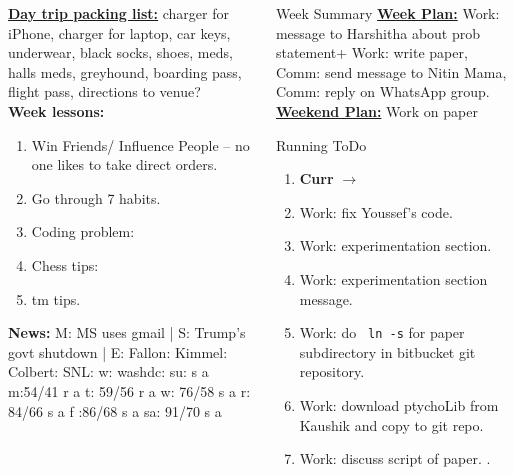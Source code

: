\begin{columns}
\begin{column}{0.25\linewidth}
      \begin{block}
        
      {\underline{\bf Day trip packing list:} charger for iPhone,
        charger for laptop, car keys, underwear, black socks, shoes,
        meds, halls meds, greyhound, boarding pass, flight pass, directions to
        venue?} \\ 
      {\tiny {\bf Week lessons:}} \\ 
      \begin{enumerate}
        \tiny \item \tiny Win Friends/ Influence People – no one
        likes to take direct orders.
      \item \tiny Go through 7 habits.
      \item \tiny Coding problem: 
      \item \tiny Chess tips: 
      \item \tiny tm tips.
      \end{enumerate}
          {{\tiny {\bf News:}} M: MS uses gmail | S:  Trump's govt shutdown | E:
            Fallon:   Kimmel:  Colbert: SNL:
            w: washdc: 
            {su: { s a}}
            {m:{54/41 r a}}
            {t: {59/56 r a}} 
            {w: {76/58 s a}} 
            {r: {84/66 s a}}
            {f :{86/68 s a} }
            {sa: {91/70 s a}}}
    \end{block} 

  \end{column}
  \begin{column}{0.5\linewidth}
    \begin{block}{Week Summary} 
      {\underline {\bf Week Plan:}
        Work: message to Harshitha about prob statement+ Work: write
        paper, Comm: send message to Nitin Mama, Comm: reply on  WhatsApp group.  } \\
      {\underline{\bf Weekend Plan:} Work on paper }\\
    \end{block}

      \begin{block}{Running ToDo} %
        \begin{enumerate} 
          \item \tiny \textbf{Curr} $\rightarrow$
          \item \tiny Work: fix Youssef's code. 

          \item \tiny Work: experimentation section. 
          \item \tiny Work: experimentation section message.
          \item \tiny Work: do \texttt{ ln -s} for paper subdirectory in bitbucket git repository.
          \item \tiny Work: download ptychoLib from Kaushik and copy to git repo.            
          \item \tiny Work: discuss script of paper. 
             .


\end{enumerate}
\end{block}
\end{column}
\end{columns}
